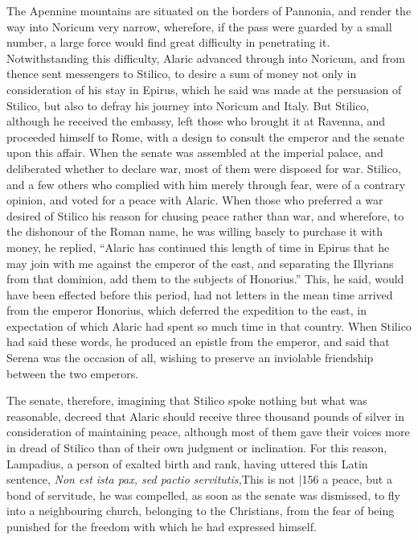 The Apennine mountains are situated on the borders of Pannonia, and render the way into Noricum very narrow, wherefore, if the pass were guarded by a small number, a large force would find great difficulty in penetrating it. Notwithstanding this difficulty, Alaric advanced through into Noricum, and from thence sent messengers to Stilico, to desire a sum of money not only in consideration of his stay in Epirus, which he said was made at the persuasion of Stilico, but also to defray his journey into Noricum and Italy. But Stilico, although he received the embassy, left those who brought it at Ravenna, and proceeded himself to Rome, with a design to consult the emperor and the senate upon this affair. When the senate was assembled at the imperial palace, and deliberated whether to declare war, most of them were disposed for war. Stilico, and a few others who complied with him merely through fear, were of a contrary opinion, and voted for a peace with Alaric. When those who preferred a war desired of Stilico his reason for chusing peace rather than war, and wherefore, to the dishonour of the Roman name, he was willing basely to purchase it with money, he replied, ``Alaric has continued this length of time in Epirus that he may join with me against the emperor of the east, and separating the Illyrians from that dominion, add them to the subjects of Honorius.'' This, he said, would have been effected before this period, had not letters in the mean time arrived from the emperor Honorius, which deferred the expedition to the east, in expectation of which Alaric had spent so much time in that country. When Stilico had said these words, he produced an epistle from the emperor, and said that Serena was the occasion of all, wishing to preserve an inviolable friendship between the two emperors.

The senate, therefore, imagining that Stilico spoke nothing but what was reasonable, decreed that Alaric should receive three thousand pounds of silver in consideration of maintaining peace, although most of them gave their voices more in dread of Stilico than of their own judgment or inclination. For this reason, Lampadius, a person of exalted birth and rank, having uttered this Latin sentence, \emph{Non est ista pax, sed pactio servitutis,}This is not
|156 a peace, but a bond of servitude, he was compelled, as soon as the senate was dismissed, to fly into a neighbouring church, belonging to the Christians, from the fear of being punished for the freedom with which he had expressed himself.

